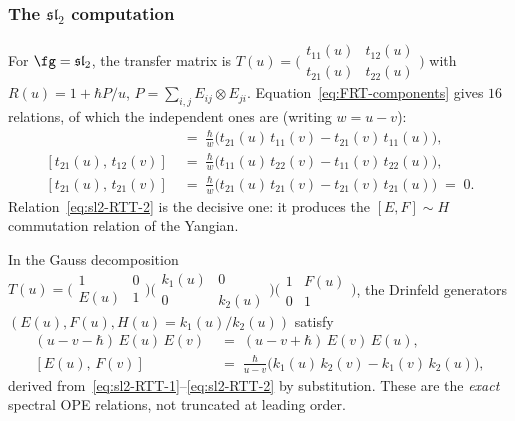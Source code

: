 \subsubsection*{The $\mathfrak{sl}_2$ computation}

For $\fg = \mathfrak{sl}_2$, the transfer matrix is
$T(u) = \bigl(\begin{smallmatrix}
t_{11}(u) & t_{12}(u) \\ t_{21}(u) & t_{22}(u)
\end{smallmatrix}\bigr)$
with $R(u) = 1 + \hbar P/u$,
$P = \sum_{i,j} E_{ij} \otimes E_{ji}$.
Equation~\eqref{eq:FRT-components} gives $16$ relations, of
which the independent ones are \textup(writing
$w = u - v$\textup):
\begin{align}
[t_{11}(u),\, t_{21}(v)]
&\;=\;
\frac{\hbar}{w}\bigl(t_{21}(u)\,t_{11}(v)
 - t_{21}(v)\,t_{11}(u)\bigr),
\\[3pt]
[t_{21}(u),\, t_{12}(v)]
&\;=\;
\frac{\hbar}{w}\bigl(t_{11}(u)\,t_{22}(v)
 - t_{11}(v)\,t_{22}(u)\bigr),
\\[3pt]
[t_{21}(u),\, t_{21}(v)]
&\;=\;
\frac{\hbar}{w}\bigl(t_{21}(u)\,t_{21}(v)
 - t_{21}(v)\,t_{21}(u)\bigr)
\;=\; 0.
\end{align}
Relation~\eqref{eq:sl2-RTT-2} is the decisive one: it produces
the $[E, F] \sim H$ commutation relation of the Yangian.

In the Gauss decomposition
$T(u) = \bigl(\begin{smallmatrix} 1 & 0 \\ E(u) & 1
\end{smallmatrix}\bigr)
\bigl(\begin{smallmatrix} k_1(u) & 0 \\ 0 & k_2(u)
\end{smallmatrix}\bigr)
\bigl(\begin{smallmatrix} 1 & F(u) \\ 0 & 1
\end{smallmatrix}\bigr)$,
the Drinfeld generators $(E(u), F(u), H(u) = k_1(u)/k_2(u))$
satisfy
\begin{align}
(u - v - \hbar)\,E(u)\,E(v)
&\;=\;
(u - v + \hbar)\,E(v)\,E(u),
\\[3pt]
[E(u),\, F(v)]
&\;=\;
\frac{\hbar}{u - v}
\bigl(k_1(u)\,k_2(v) - k_1(v)\,k_2(u)\bigr),
\end{align}
derived from~\eqref{eq:sl2-RTT-1}--\eqref{eq:sl2-RTT-2} by
substitution. These are the \emph{exact} spectral OPE
relations, not truncated at leading order.

